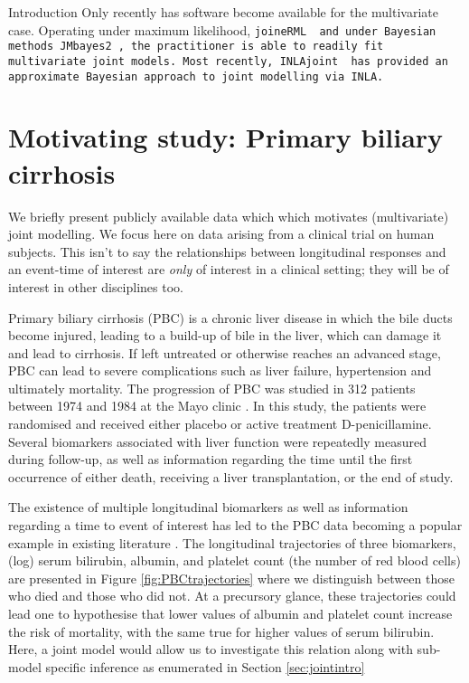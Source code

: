 \begin{chapter}{\label{cha:intro}Introduction}
  Only recently has software become available for the multivariate case. Operating under maximum likelihood, \tt{joineRML} \citep{Hickey2018} and under Bayesian methods \tt{JMbayes2} \citep{R-JMbayes2}, the practitioner is able to readily fit multivariate joint models. Most recently, \tt{INLAjoint} \citep{Rustand2023} has provided an approximate Bayesian approach to joint modelling via \tt{INLA}.

  \section{\label{sec:intro-motivation-pbc}Motivating study: Primary biliary cirrhosis}
  We briefly present publicly available data which which motivates (multivariate) joint modelling. We focus here on data arising from a clinical trial on human subjects. This isn't to say the relationships between longitudinal responses and an event-time of interest are \textit{only} of interest in a clinical setting; they will be of interest in other disciplines too.
  
  Primary biliary cirrhosis (PBC) is a chronic liver disease in which the bile ducts become injured, leading to a build-up of bile in the liver, which can damage it and lead to cirrhosis. If left untreated or otherwise reaches an advanced stage, PBC can lead to severe complications such as liver failure, hypertension and ultimately mortality. The progression of PBC was studied in 312 patients between 1974 and 1984 at the Mayo clinic \citep{PBCarticle}. In this study, the patients were randomised and received either placebo or active treatment D-penicillamine. Several biomarkers associated with liver function were repeatedly measured during follow-up, as well as information regarding the time until the first occurrence of either death, receiving a liver transplantation, or the end of study. 
  
  The existence of multiple longitudinal biomarkers as well as information regarding a time to event of interest has led to the PBC data becoming a popular example in existing literature \citep{Hickey2018, PBCapp1, PBCapp2, PBCapp3}. The longitudinal trajectories of three biomarkers, (log) serum bilirubin, albumin, and platelet count (\ie the number of red blood cells) are presented in Figure \ref{fig:PBCtrajectories} where we distinguish between those who died and those who did not. At a precursory glance, these trajectories could lead one to hypothesise that lower values of albumin and platelet count increase the risk of mortality, with the same true for higher values of serum bilirubin. Here, a joint model would allow us to investigate this relation along with sub-model specific inference as enumerated in Section \ref{sec:jointintro}
  

\end{chapter}
